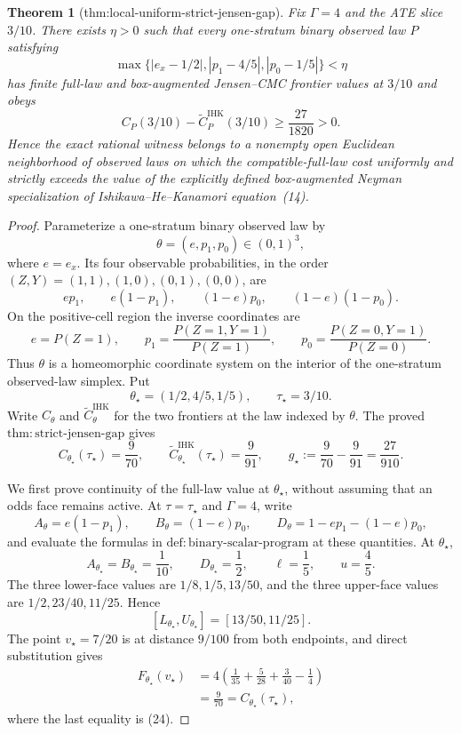 \documentclass{article}
\newtheorem{theorem}{Theorem}
\begin{document}
\begin{theorem}[thm:local-uniform-strict-jensen-gap]\label{thm:local-uniform-strict-jensen-gap}
Fix \(\Gamma=4\) and the ATE slice \(3/10\).  There exists \(\eta>0\) such that every one-stratum binary observed law \(P\) satisfying
\[
 \max\{|e_x-1/2|,|p_1-4/5|,|p_0-1/5|\}<\eta
\]
has finite full-law and box-augmented Jensen--CMC frontier values at \(3/10\) and obeys
\[
 C_P(3/10)-\widetilde C^{\mathrm{IHK}}_P(3/10)\geq\frac{27}{1820}>0.
\]
Hence the exact rational witness belongs to a nonempty open Euclidean neighborhood of observed laws on which the compatible-full-law cost uniformly and strictly exceeds the value of the explicitly defined box-augmented Neyman specialization of Ishikawa--He--Kanamori equation~(14).
\end{theorem}
\begin{proof}
Parameterize a one-stratum binary observed law by
\[
\theta=(e,p_1,p_0)\in(0,1)^3,
\]
where \(e=e_x\).  Its four observable probabilities, in the order \((Z,Y)=(1,1),(1,0),(0,1),(0,0)\), are
\[
ep_1,\qquad e(1-p_1),\qquad(1-e)p_0,\qquad(1-e)(1-p_0).
\tag{22}
\]
On the positive-cell region the inverse coordinates are
\[
e=P(Z=1),\qquad
p_1=\frac{P(Z=1,Y=1)}{P(Z=1)},\qquad
p_0=\frac{P(Z=0,Y=1)}{P(Z=0)}.
\tag{23}
\]
Thus \(\theta\) is a homeomorphic coordinate system on the interior of the one-stratum observed-law simplex.  Put
\[
\theta_\star=(1/2,4/5,1/5),
\qquad \tau_\star=3/10.
\]
Write \(C_\theta\) and \(\widetilde C^{\mathrm{IHK}}_\theta\) for the two frontiers at the law indexed by \(\theta\).  The proved \(\mathrm{thm{:}strict\mbox{-}jensen\mbox{-}gap}\) gives
\[
C_{\theta_\star}(\tau_\star)=\frac9{70},\qquad
\widetilde C^{\mathrm{IHK}}_{\theta_\star}(\tau_\star)=\frac9{91},\qquad
g_\star:=\frac9{70}-\frac9{91}=\frac{27}{910}.
\tag{24}
\]

We first prove continuity of the full-law value at \(\theta_\star\), without assuming that an odds face remains active.  At \(\tau=\tau_\star\) and \(\Gamma=4\), write
\[
A_\theta=e(1-p_1),\qquad
B_\theta=(1-e)p_0,
\qquad
D_\theta=1-ep_1-(1-e)p_0,
\]
and evaluate the formulas in \(\mathrm{def{:}binary\mbox{-}scalar\mbox{-}program}\) at these quantities.  At \(\theta_\star\),
\[
A_{\theta_\star}=B_{\theta_\star}=\frac1{10},
\qquad D_{\theta_\star}=\frac12,
\qquad \ell=\frac15,
\qquad u=\frac45.
\]
The three lower-face values are \(1/8,1/5,13/50\), and the three upper-face values are \(1/2,23/40,11/25\).  Hence
\[
[L_{\theta_\star},U_{\theta_\star}]=[13/50,11/25].
\tag{25}
\]
The point \(v_\star=7/20\) is at distance \(9/100\) from both endpoints, and direct substitution gives
\[
\begin{aligned}
F_{\theta_\star}(v_\star)
&=4\left(\frac1{35}+\frac5{28}+\frac3{40}-\frac14\right)\\
&=\frac9{70}=C_{\theta_\star}(\tau_\star),
\end{aligned}
\tag{26}
\]
where the last equality is (24).


\end{proof}
\end{document}
